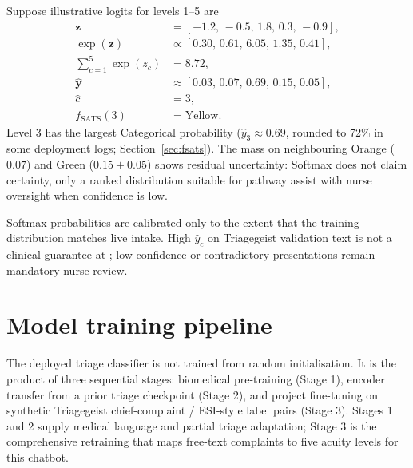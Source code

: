 \begin{example}
Suppose illustrative logits for levels 1--5 are
\begin{align*}
  \mathbf{z} &= [-1.2,\,-0.5,\,1.8,\,0.3,\,-0.9], \\
  \exp(\mathbf{z}) &\propto [0.30,\,0.61,\,6.05,\,1.35,\,0.41], \\
  \sum_{c=1}^{5} \exp(z_c) &= 8.72, \\
  \hat{\mathbf{y}} &\approx [0.03,\,0.07,\,0.69,\,0.15,\,0.05], \\
  \hat{c} &= 3, \\
  f_{\mathrm{SATS}}(3) &= \text{Yellow}.
\end{align*}
Level 3 has the largest Categorical probability (\(\hat{y}_3 \approx 0.69\), rounded to 72\% in some deployment logs; Section~\ref{sec:fsats}). The mass on neighbouring Orange (\(0.07\)) and Green (\(0.15+0.05\)) shows residual uncertainty: Softmax does not claim certainty, only a ranked distribution suitable for pathway assist with nurse oversight when confidence is low.
\end{example}

\begin{remark}
Softmax probabilities are calibrated only to the extent that the training distribution matches live intake. High \(\hat{y}_c\) on Triagegeist validation text is not a clinical guarantee at \examplehospital{}; low-confidence or contradictory presentations remain mandatory nurse review.
\end{remark}

\section{Model training pipeline}
\label{sec:training-pipeline}

The deployed triage classifier is not trained from random initialisation. It is the product of three sequential stages: biomedical pre-training (Stage 1), encoder transfer from a prior triage checkpoint (Stage 2), and project fine-tuning on synthetic Triagegeist chief-complaint / ESI-style label pairs (Stage 3). Stages 1 and 2 supply medical language and partial triage adaptation; Stage 3 is the comprehensive retraining that maps free-text complaints to five acuity levels for this chatbot.

